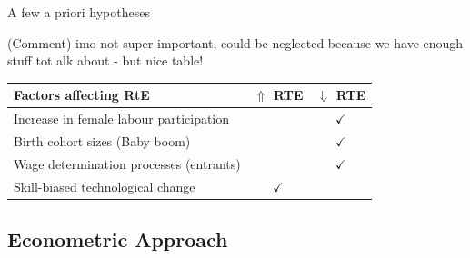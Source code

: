 \documentclass[10pt,ignorenonframetext,]{beamer}
\begin{document}
\begin{frame}{A few a priori hypotheses}
\protect\hypertarget{a-few-a-priori-hypotheses}{}

(Comment) imo not super important, could be neglected because we have
enough stuff tot alk about - but nice table!

\begin{longtable}[]{@{}lcc@{}}
\toprule
Factors affecting RtE & \(\Uparrow\) RTE & \(\Downarrow\)
RTE\tabularnewline
\midrule
\endhead
Increase in female labour participation & &
\(\checkmark\)\tabularnewline
Birth cohort sizes (Baby boom) & & \(\checkmark\)\tabularnewline
Wage determination processes (entrants) & &
\(\checkmark\)\tabularnewline
Skill-biased technological change & \(\checkmark\) &\tabularnewline
\bottomrule
\end{longtable}

\end{frame}

\hypertarget{econometric-approach}{%
\subsection{Econometric Approach}\label{econometric-approach}}
\end{document}
